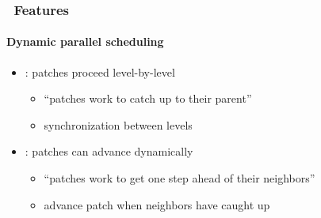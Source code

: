 \begin{frame}[fragile] 
\frametitle{\cello\ Features}
\framesubtitle{Dynamic parallel scheduling}
\begin{itemize}
\item{}\enzo: patches proceed level-by-level
\begin{itemize}
\item{}   ``patches work to catch up to their parent''
\item{}   synchronization between levels
\end{itemize}
\item{}\cello: patches can advance dynamically
\begin{itemize}
\item{}   ``patches work to get one step ahead of their neighbors''
\item{}     advance patch when neighbors have caught up
\end{itemize}
\end{itemize}
\end{frame}
